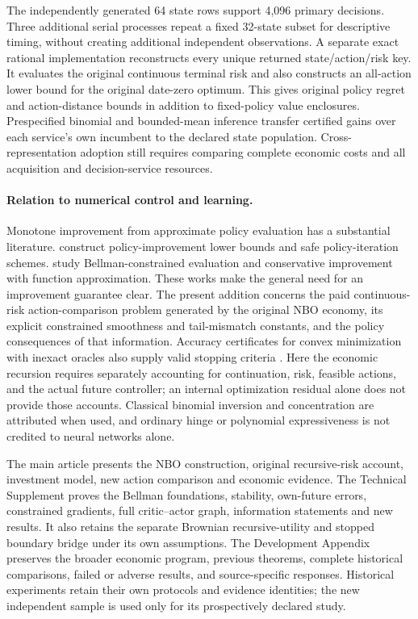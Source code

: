 The independently generated 64 state rows support 4,096 primary decisions.
Three additional serial processes repeat a fixed 32-state subset for descriptive
timing, without creating additional independent observations. A separate exact
rational implementation reconstructs every unique returned state/action/risk
key. It evaluates the original continuous terminal risk and also constructs an
all-action lower bound for the original date-zero optimum. This gives original
policy regret and action-distance bounds in addition to fixed-policy value
enclosures. Prespecified binomial and bounded-mean inference transfer certified
gains over each service's own incumbent to the declared state population.
Cross-representation adoption still requires comparing complete economic costs
and all acquisition and decision-service resources.

\paragraph{Relation to numerical control and learning.}
Monotone improvement from approximate policy evaluation has a substantial
literature. \citet{metelli2021} construct policy-improvement lower bounds and safe
policy-iteration schemes. \citet{eshwar2026} study Bellman-constrained evaluation
and conservative improvement with function approximation. These works make the
general need for an improvement guarantee clear. The present addition concerns
the paid continuous-risk action-comparison problem generated by the original
NBO economy, its explicit constrained smoothness and tail-mismatch constants,
and the policy consequences of that information.
Accuracy certificates for convex minimization with inexact oracles also supply
valid stopping criteria \citep{gladin2023}. Here the economic recursion requires
separately accounting for continuation, risk, feasible actions, and the actual
future controller; an internal optimization residual alone does not provide
those accounts. Classical binomial inversion and concentration are attributed
when used, and ordinary hinge or polynomial expressiveness is not credited to
neural networks alone.

The main article presents the NBO construction, original recursive-risk account,
investment model, new action comparison and economic evidence. The Technical
Supplement proves the Bellman foundations, stability, own-future errors,
constrained gradients, full critic--actor graph, information statements and
new results. It also retains the separate Brownian recursive-utility and stopped
boundary bridge under its own assumptions. The Development Appendix preserves
the broader economic program, previous theorems, complete historical comparisons,
failed or adverse results, and source-specific responses. Historical experiments
retain their own protocols and evidence identities; the new independent sample
is used only for its prospectively declared study.
